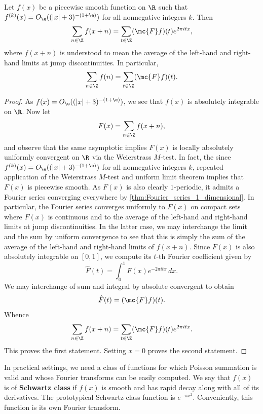     \begin{theorem}
      Let \(f(x)\) be a piecewise smooth function on \(\R\) such that \(f^{(k)}(x) = O_{\e}((|x|+3)^{-(1+\e)})\) for all nonnegative integers \(k\). Then
      \[
        \sum_{n \in \Z}f(x+n) = \sum_{t \in \Z}(\mc{F}f)(t)e^{2\pi itx},
      \]
      where \(f(x+n)\) is understood to mean the average of the left-hand and right-hand limits at jump discontinuities. In particular,
      \[
        \sum_{n \in \Z}f(n) = \sum_{t \in \Z}(\mc{F}f)(t).
      \]
    \end{theorem}
    \begin{proof}
      As \(f(x) = O_{\e}((|x|+3)^{-(1+\e)})\), we see that \(f(x)\) is absolutely integrable on \(\R\). Now let
      \[
        F(x) = \sum_{n \in \Z}f(x+n),
      \]
      and observe that the same asymptotic implies \(F(x)\) is locally absolutely uniformly convergent on \(\R\) via the Weierstrass \(M\)-test. In fact, the since \(f^{(k)}(x) = O_{\e}((|x|+3)^{-(1+\e)})\) for all nonnegative integers \(k\), repeated application of the Weierstrass \(M\)-test and uniform limit theorem implies that \(F(x)\) is piecewise smooth. As \(F(x)\) is also clearly \(1\)-periodic, it admits a Fourier series converging everywhere by \cref{thm:Fourier_series_1_dimensional}. In particular, the Fourier series converges uniformly to \(F(x)\) on compact sets where \(F(x)\) is continuous and to the average of the left-hand and right-hand limits at jump discontinuities. In the latter case, we may interchange the limit and the sum by uniform convergence to see that this is simply the sum of the average of the left-hand and right-hand limits of \(f(x+n)\). Since \(F(x)\) is also absolutely integrable on \([0,1]\), we compute its \(t\)-th Fourier coefficient given by
      \[
        \hat{F}(t) = \int_{0}^{1}F(x)e^{-2\pi itx}\,dx.
      \]
      We may interchange of sum and integral by absolute convergent to obtain
      \[
        \hat{F}(t) = (\mc{F}f)(t).
      \]
      Whence
      \[
        \sum_{n \in \Z}f(x+n) = \sum_{t \in \Z}(\mc{F}f)(t)e^{2\pi itx}.
      \]
      This proves the first statement. Setting \(x = 0\) proves the second statement.
    \end{proof}

    In practical settings, we need a class of functions for which Poisson summation is valid and whose Fourier transforms can be easily computed. We say that \(f(x)\) is of \textbf{Schwartz class} if \(f(x)\) is smooth and has rapid decay along with all of its derivatives. The prototypical Schwartz class function is \(e^{-\pi x^{2}}\). Conveniently, this function is its own Fourier transform.

